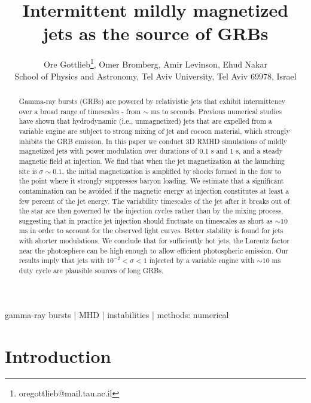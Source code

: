 \documentclass[fleqn,usenatbib]{mnras}
\title[GRBs from intermittent mildly magnetized jets]{Intermittent mildly magnetized jets as the source of GRBs}
\author[O. Gottlieb et al.]{
	Ore Gottlieb\thanks{oregottlieb@mail.tau.ac.il},
	Omer Bromberg,
	Amir Levinson,
	Ehud Nakar
	\\
	{School of Physics and Astronomy, Tel Aviv University, Tel Aviv 69978, Israel}
}
\begin{document}
	\label{firstpage}
	\pagerange{\pageref{firstpage}--\pageref{lastpage}}
	\maketitle	
	\begin{abstract}

Gamma-ray bursts (GRBs) are powered by relativistic jets that exhibit intermittency over a broad range of timescales - from $ \sim $ ms to seconds.  Previous numerical studies have shown that hydrodynamic (i.e., unmagnetized) jets that are expelled from a variable engine are subject to strong mixing of jet and cocoon material, which strongly inhibits the GRB emission. In this paper we conduct 3D RMHD simulations of mildly magnetized jets with power modulation over durations of 0.1 s and 1 s, and a steady magnetic field at injection. We find that when the jet magnetization at the launching site is $\sigma \sim 0.1$, the initial magnetization is amplified by shocks formed in the flow to the point where it strongly suppresses baryon loading. We estimate that a significant contamination can be avoided if the magnetic energy at injection constitutes at least a few percent of the jet energy. The variability timescales of the jet after it breaks out of the star are then governed by the injection cycles rather than by the mixing process, suggesting that in practice jet injection should fluctuate on timescales as short as  $ \sim 10 $ ms in order to account for the observed light curves. Better stability is found for jets with shorter modulations. We conclude that for sufficiently hot jets, the Lorentz factor near the photosphere can be high enough to allow efficient photospheric emission. Our results imply that jets with $ 10^{-2} < \sigma < 1 $ injected by a variable engine with $ \sim 10 $ ms duty cycle are plausible sources of long GRBs.

	\end{abstract}
	\begin{keywords}
		{gamma-ray bursts | MHD | instabilities | methods: numerical}
	\end{keywords}
	
	\section{Introduction}
	\label{sec:introduction}
	
\end{document}
